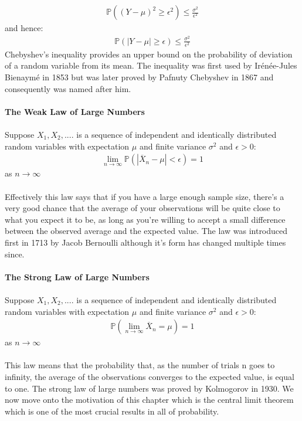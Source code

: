 \documentclass[,oneside]{article}
\begin{document}
\begin{enumerate}
\begin{align*}
\mathbb{P}((Y-\mu)^2 \geq \epsilon^2) \leq \frac{\sigma^2}{\epsilon^2}
\end{align*}
and hence:
\begin{align*}
\mathbb{P}(|Y-\mu| \geq \epsilon) \leq \frac{\sigma^2}{\epsilon^2}
\end{align*}
Chebyshev's inequality provides an upper bound on the probability of deviation of a random variable from its mean. The inequality was first used by Irénée-Jules Bienaymé in 1853 but was later proved by Pafnuty Chebyshev in 1867 and consequently was named after him.\\ \\
\textbf{The Weak Law of Large Numbers}\\ \\
Suppose $X_1, X_2,....$ is a sequence of independent and identically distributed random variables with expectation $\mu$ and finite variance $\sigma^2$ and $\epsilon > 0$:
\begin{align*}
\lim_{n \to \infty} \mathbb{P}(|\overline{X}_n - \mu | < \epsilon)=1
\end{align*}
as $n \to \infty$\\ \\
Effectively this law says that if you have a large enough sample size, there's a very good chance that the average of your observations will be quite close to what you expect it to be, as long as you're willing to accept a small difference between the observed average and the expected value. The law was introduced first in 1713 by Jacob Bernoulli although it's form has changed multiple times since.\\ \\
\textbf{The Strong Law of Large Numbers}\\ \\
Suppose $X_1, X_2,....$ is a sequence of independent and identically distributed random variables with expectation $\mu$ and finite variance $\sigma^2$ and $\epsilon > 0$:
\begin{align*}
\mathbb{P} \left ( \lim_{n \to \infty} \overline{X}_n = \mu \right ) = 1 
\end{align*}
as $n \to \infty$\\ \\
This law means that the probability that, as the number of trials n goes to infinity, the average of the observations converges to the expected value, is equal to one. The strong law of large numbers was proved by Kolmogorov in 1930. We now move onto the motivation of this chapter which is the central limit theorem which is one of the most crucial results in all of probability.

\end{enumerate}
\end{document}
